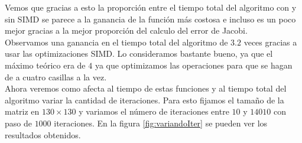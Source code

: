 \documentclass[a4paper]{article}
\begin{document}
Vemos que gracias a esto la proporción entre el tiempo total del 
algoritmo con y sin SIMD se parece a la ganancia de la función más 
costosa e incluso es un poco mejor gracias a la mejor proporción del 
calculo del error de Jacobi.\\
Observamos una ganancia en el tiempo total del algoritmo de $3.2$ 
veces gracias a usar las optimizaciones SIMD. Lo consideramos bastante 
bueno, ya que el máximo teórico era de $4$ ya que optimizamos las 
operaciones para que se hagan de a cuatro casillas a la vez.\\

\bigskip
Ahora veremos como afecta al tiempo de estas funciones y al tiempo 
total del algoritmo variar la cantidad de iteraciones. Para esto 
fijamos el tamaño de la matriz en $130 \times 130$ y variamos el 
número de iteraciones entre $10$ y $14010$ con paso de $1000$ iteraciones.
En la figura \ref{fig:variandoIter} se pueden ver los resultados obtenidos.
\end{document}
